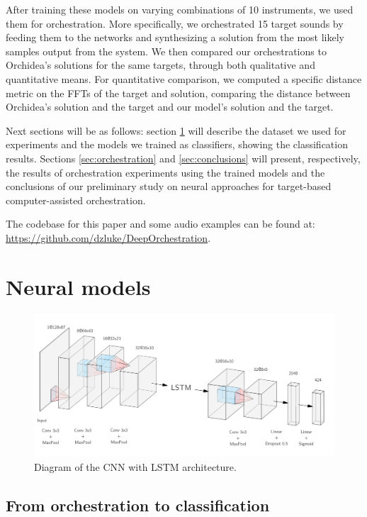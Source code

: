 \documentclass{article}
\begin{document}
After training these models on varying combinations of 10 instruments, we used them for orchestration. More specifically, we orchestrated 15 target sounds by feeding them to the networks and synthesizing a solution from the most likely samples output from the system. We then compared our orchestrations to Orchidea's solutions for the same targets, through both qualitative and quantitative means. For quantitative comparison, we computed a specific distance metric on the FFTs of the target and solution, comparing the distance between Orchidea's solution and the target and our model's solution and the target.

Next sections will be as follows: section \ref{sec:models} will describe the dataset we used for experiments and the models we trained as classifiers, showing the classification results. Sections \ref{sec:orchestration} and \ref{sec:conclusions} will present, respectively, the results of orchestration experiments using the trained models and the conclusions of our preliminary study on neural approaches for target-based computer-assisted orchestration.

The codebase for this paper and some audio examples can be found at: \url{https://github.com/dzluke/DeepOrchestration}.

\section{Neural models}
\label{sec:models}


\begin{figure}
\begin{center}
\includegraphics[scale=0.22]{figs/CNN_LSTM_diagram.png}
\caption{Diagram of the CNN with LSTM architecture. \label{cnn_lstm}}
\end{center}
\end{figure}

\subsection{From orchestration to classification}
\end{document}

